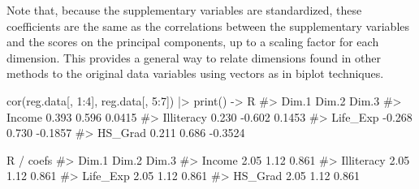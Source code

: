 \documentclass[
  letterpaper,
  10pt,
  krantz2]{krantz}
\makeatletter
\newenvironment{Shaded}{\begin{snugshade}}{\end{snugshade}}
\newcommand{\AttributeTok}[1]{\textcolor[rgb]{0.40,0.45,0.13}{#1}}
\newcommand{\CommentTok}[1]{\textcolor[rgb]{0.37,0.37,0.37}{#1}}
\newcommand{\DecValTok}[1]{\textcolor[rgb]{0.68,0.00,0.00}{#1}}
\newcommand{\FloatTok}[1]{\textcolor[rgb]{0.68,0.00,0.00}{#1}}
\newcommand{\FunctionTok}[1]{\textcolor[rgb]{0.28,0.35,0.67}{#1}}
\newcommand{\NormalTok}[1]{\textcolor[rgb]{0.00,0.23,0.31}{#1}}
\newcommand{\OtherTok}[1]{\textcolor[rgb]{0.00,0.23,0.31}{#1}}
\newcommand{\SpecialCharTok}[1]{\textcolor[rgb]{0.37,0.37,0.37}{#1}}
\newenvironment{kframe}{%
  \medskip{}
  \setlength{\fboxsep}{.8em}
  \def\at@end@of@kframe{}%
  \ifinner\ifhmode%
  \def\at@end@of@kframe{\end{minipage}}%
  \begin{minipage}{\columnwidth}%
  \fi\fi%
  \def\FrameCommand##1{\hskip\@totalleftmargin \hskip-\fboxsep
  \colorbox{shadecolor}{##1}\hskip-\fboxsep
      \hskip-\linewidth \hskip-\@totalleftmargin \hskip\columnwidth}%
  \MakeFramed {\advance\hsize-\width
    \@totalleftmargin\z@ \linewidth\hsize
    \@setminipage}}%
{\par\unskip\endMakeFramed%
  \at@end@of@kframe}
\renewenvironment{Shaded}{\begin{kframe}}{\end{kframe}}
\makeatother
\begin{document}
\begin{Shaded}
\end{Shaded}

Note that, because the supplementary variables are standardized, these
coefficients are the same as the correlations between the supplementary
variables and the scores on the principal components, up to a scaling
factor for each dimension. This provides a general way to relate
dimensions found in other methods to the original data variables using
vectors as in biplot techniques.

\begin{Shaded}
\begin{Highlighting}[]
\FunctionTok{cor}\NormalTok{(reg.data[, }\DecValTok{1}\SpecialCharTok{:}\DecValTok{4}\NormalTok{], reg.data[, }\DecValTok{5}\SpecialCharTok{:}\DecValTok{7}\NormalTok{]) }\SpecialCharTok{|\textgreater{}}
  \FunctionTok{print}\NormalTok{() }\OtherTok{{-}\textgreater{}}\NormalTok{ R}
\CommentTok{\#\textgreater{}             Dim.1  Dim.2   Dim.3}
\CommentTok{\#\textgreater{} Income      0.393  0.596  0.0415}
\CommentTok{\#\textgreater{} Illiteracy  0.230 {-}0.602  0.1453}
\CommentTok{\#\textgreater{} Life\_Exp   {-}0.268  0.730 {-}0.1857}
\CommentTok{\#\textgreater{} HS\_Grad     0.211  0.686 {-}0.3524}

\NormalTok{R }\SpecialCharTok{/}\NormalTok{ coefs}
\CommentTok{\#\textgreater{}            Dim.1 Dim.2 Dim.3}
\CommentTok{\#\textgreater{} Income      2.05  1.12 0.861}
\CommentTok{\#\textgreater{} Illiteracy  2.05  1.12 0.861}
\CommentTok{\#\textgreater{} Life\_Exp    2.05  1.12 0.861}
\CommentTok{\#\textgreater{} HS\_Grad     2.05  1.12 0.861}
\end{Highlighting}
\end{Shaded}
\end{document}
